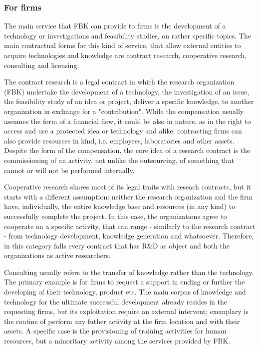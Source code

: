 \subsubsection{For firms}

The main service that FBK can provide to firms is the development of a technology or investigations and feasibility studies, on rather specific topics. The main contractual forms for this kind of service, that allow external entities to acquire technologies and knowledge are contract research, cooperative research, consulting and licensing. 

The contract research is a legal contract in which the research organization (FBK) undertake the development of a technology, the investigation of an issue, the feasibility study of an idea or project, deliver a specific knowledge, to another organization in exchange for a "contribution". While the compensation usually assumes the form of a financial flow, it could be also in nature, as in the right to access and use a protected idea or technology and alike; contracting firms can also provide resources in kind, i.e. employees, laboratories and other assets. Despite the form of the compensation, the core idea of a research contract is the commissioning of an activity, not unlike the outsourcing, of something that cannot or will not be performed internally.

Cooperative research shares most of its legal traits with reseach contracts, but it starts with a different assumption: neither the research organization and the firm have, individually, the entire knowledge base and resources (in any kind) to successfully complete the project. In this case, the organizations agree to cooperate on a specific activity, that can range - similarly to the research contract - from technology development, knowledge generation and whatsoever. Therefore, in this category falls every contract that has R\&D as object and both the organizations as active researchers.

Consulting usually refers to the transfer of knowledge rather than the technology. The primary example is for firms to request a support in ending or further the developing of their technology, product etc. The main corpus of knowledge and technology for the ultimate successful development already resides in the requesting firms, but its exploitation require an external intervent; exemplary is the routine of perform any futher activity at the firm location and with their assets. A specific case is the provisioning of training activities for human resources, but a minoritary activity among the services provided by FBK.

